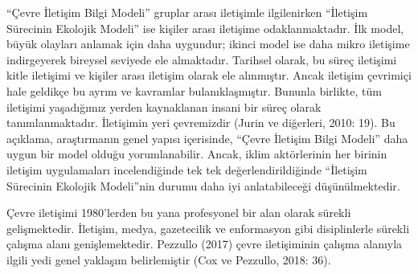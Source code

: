 \documentclass[
]{book}
\begin{document}
``Çevre İletişim Bilgi Modeli'' gruplar arası iletişimle ilgilenirken ``İletişim Sürecinin Ekolojik Modeli'' ise kişiler arası iletişime odaklanmaktadır. İlk model, büyük olayları anlamak için daha uygundur; ikinci model ise daha mikro iletişime indirgeyerek bireysel seviyede ele almaktadır. Tarihsel olarak, bu süreç iletişimi kitle iletişimi ve kişiler arası iletişim olarak ele alınmıştır. Ancak iletişim çevrimiçi hale geldikçe bu ayrım ve kavramlar bulanıklaşmıştır. Bununla birlikte, tüm iletişimi yaşadığımız yerden kaynaklanan insani bir süreç olarak tanımlanmaktadır. İletişimin yeri çevremizdir (Jurin ve diğerleri, 2010: 19). Bu açıklama, araştırmanın genel yapısı içerisinde, ``Çevre İletişim Bilgi Modeli'' daha uygun bir model olduğu yorumlanabilir. Ancak, iklim aktörlerinin her birinin iletişim uygulamaları incelendiğinde tek tek değerlendirildiğinde ``İletişim Sürecinin Ekolojik Modeli''nin durumu daha iyi anlatabileceği düşünülmektedir.

Çevre iletişimi 1980'lerden bu yana profesyonel bir alan olarak sürekli gelişmektedir. İletişim, medya, gazetecilik ve enformasyon gibi disiplinlerle sürekli çalışma alanı genişlemektedir. Pezzullo (2017) çevre iletişiminin çalışma alanıyla ilgili yedi genel yaklaşım belirlemiştir (Cox ve Pezzullo, 2018: 36).
\end{document}
